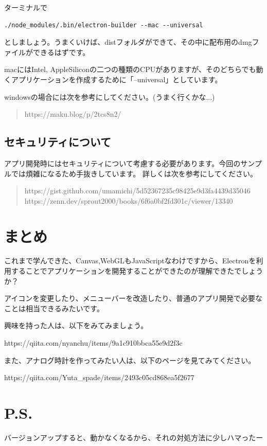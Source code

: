 \documentclass[mingoth,11pt,a4j,uplatex]{jsarticle}
\begin{document}
ターミナルで
\begin{verbatim}
./node_modules/.bin/electron-builder --mac --universal
\end{verbatim}
としましょう。うまくいけば、distフォルダができて、その中に配布用のdmgファイルができるはずです。

macにはIntel, AppleSiliconの二つの種類のCPUがありますが、そのどちらでも動くアプリケーションを作成するために「--universal」としています。

windowsの場合には次を参考にしてください。(うまく行くかな...)
\begin{quote}
https://maku.blog/p/2tcs8n2/
\end{quote}

\subsection{セキュリティについて}
アプリ開発時にはセキュリティについて考慮する必要があります。今回のサンプルでは煩雑になるため手抜きしています。
詳しくは次を参考にしてください。
\begin{quote}
https://gist.github.com/umamichi/5d52367235c98425e9d3fa4439d35046\\
https://zenn.dev/sprout2000/books/6f6a0bf2fd301c/viewer/13340
\end{quote}

\section{まとめ}
これまで学んできた、Canvas,WebGLもJavaScriptなわけですから、Electronを利用することでアプリケーションを開発することができたのが理解できたでしょうか？

\vspace{1em}
アイコンを変更したり、メニューバーを改造したり、普通のアプリ開発で必要なことは相当できるみたいです。

興味を持った人は、以下をみてみましょう。

https://qiita.com/nyanchu/items/9a1c910bbca55e9d2f3c

また、アナログ時計を作ってみたい人は、以下のページを見てみてください。

https://qiita.com/Yuta\_spade/items/2493c05cd868ea5f2677

\section*{P.S.}
バージョンアップすると、動かなくなるから、それの対処方法に少しハマったー


\end{document}
